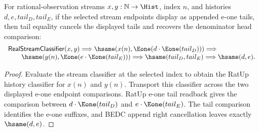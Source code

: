 \begin{theorem}
\label{thm:real-stream-classifier-selected-append-e1-tail-hsame-cancel}
For rational-observation streams $x,y:\mathbb{N}\to\Hist$, index $n$, and
histories $d,e,tail_D,tail_E$, if the selected stream endpoints display as
appended e-one tails, then tail equality cancels the displayed tails and
recovers the denominator head comparison:
$$
\begin{array}{l}
\mathsf{RealStreamClassifier}(x,y)\Longrightarrow
\hsame(x(n),\Eone(d\cdot\Eone(tail_D)))\Longrightarrow\\
\qquad
\hsame(y(n),\Eone(e\cdot\Eone(tail_E)))\Longrightarrow
\hsame(tail_D,tail_E)\Longrightarrow
\hsame(d,e).
\end{array}
$$
\end{theorem}
\begin{proof}
Evaluate the stream classifier at the selected index to obtain the RatUp
history classifier for $x(n)$ and $y(n)$. Transport this classifier across the
two displayed e-one endpoint comparisons. RatUp e-one tail readback gives the
comparison between $d\cdot\Eone(tail_D)$ and $e\cdot\Eone(tail_E)$. The tail
comparison identifies the e-one suffixes, and BEDC append right cancellation
leaves exactly $\hsame(d,e)$.
\end{proof}
